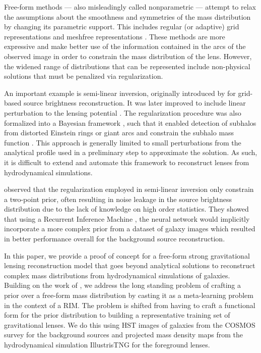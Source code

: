 \documentclass[twocolumn]{aastex631}
\begin{document}
Free-form methods --- also misleadingly called nonparametric ---
attempt to relax the
assumptions about the smoothness and symmetries of the mass distribution by 
changing its parametric support. This includes regular (or adaptive)
grid representations and meshfree representations
\citep{Saha1997,Abdelsalam1998,Abdelsalam1998b,Diego2005,Birrer2015,Merten2016}. 
These methods are more expressive and make better use of the information 
contained in the arcs of the observed image in 
order to constrain the mass distribution of the lens. 
However, the widened range of distributions that can be represented 
include non-physical solutions that must be penalized via regularization.

An important example is semi-linear inversion, originally 
introduced by \citet{Warren2003} for grid-based source brightness reconstruction. 
It was later improved to include 
linear perturbation to the lensing potential \citep{Koopmans2005}. 
The regularization procedure was also formalized into a Bayesian framework \citep{Suyu2006,Suyu2006b,Vegetti2009}, 
such that it enabled detection of subhalos from distorted 
Einstein rings or giant arcs \citep{Vegetti2010,Vegetti2012} 
and constrain the subhalo mass function \citep{Vegetti2014,Li2016}. 
This approach is generally limited to small perturbations from 
the analytical profile used in a preliminary step to approximate the solution.
As such, it is difficult to extend and automate this framework to reconstruct 
lenses from hydrodynamical simulations.

\citet{Morningstar2019} observed that the regularization employed in semi-linear inversion 
only constrain a two-point prior, often resulting in noise leakage in the source 
brightness distribution 
due to the lack of knowledge on high order statistics. They showed that using a
Recurrent Inference Machine \citep[RIM,][]{Putzky2017}, the neural network
would implicitly incorporate a more complex prior from a dataset of galaxy images which 
resulted in better performance overall for the background source reconstruction. 

In this paper, we provide a proof of concept for a free-form 
strong gravitational lensing reconstruction model that goes beyond analytical 
solutions to reconstruct complex mass distributions from hydrodynamical 
simulations of galaxies. Building on the work of \citet{Morningstar2019}, 
we address the long standing problem of crafting a prior over a free-form 
mass distribution by casting it as a meta-learning problem in the context 
of a RIM. The problem is shifted from having to craft a functional form 
for the prior distribution to building a representative training 
set of gravitational lenses. We do this using 
HST images of galaxies from the COSMOS survey \citep{Koekemoer2007,Scoville2007}
for the background sources and 
projected mass density maps from the hydrodynamical simulation IllustrisTNG 
\citep{Nelson2018} for the foreground lenses. 
\end{document}
